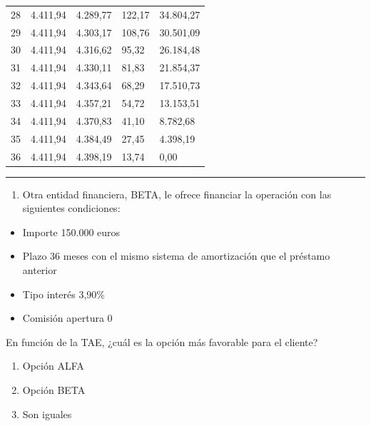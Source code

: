 \documentclass[
  letterpaper,
  DIV=11,
  numbers=noendperiod]{scrartcl}
\providecommand{\tightlist}{%
  \setlength{\itemsep}{0pt}\setlength{\parskip}{0pt}}\usepackage{longtable,booktabs,array}
\begin{document}
\begin{tcolorbox}
\begin{longtable}[]{@{}lllll@{}}
28 & 4.411,94 & 4.289,77 & 122,17 & 34.804,27 \\
29 & 4.411,94 & 4.303,17 & 108,76 & 30.501,09 \\
30 & 4.411,94 & 4.316,62 & 95,32 & 26.184,48 \\
31 & 4.411,94 & 4.330,11 & 81,83 & 21.854,37 \\
32 & 4.411,94 & 4.343,64 & 68,29 & 17.510,73 \\
33 & 4.411,94 & 4.357,21 & 54,72 & 13.153,51 \\
34 & 4.411,94 & 4.370,83 & 41,10 & 8.782,68 \\
35 & 4.411,94 & 4.384,49 & 27,45 & 4.398,19 \\
36 & 4.411,94 & 4.398,19 & 13,74 & 0,00 \\
\end{longtable}

\end{tcolorbox}

\begin{center}\rule{0.5\linewidth}{0.5pt}\end{center}

\begin{enumerate}
\def\labelenumi{\arabic{enumi}.}
\setcounter{enumi}{1}
\tightlist
\item
  Otra entidad financiera, BETA, le ofrece financiar la operación con
  las siguientes condiciones:
\end{enumerate}

\begin{itemize}
\item
  Importe 150.000 euros
\item
  Plazo 36 meses con el mismo sistema de amortización que el préstamo
  anterior
\item
  Tipo interés 3,90\%
\item
  Comisión apertura 0
\end{itemize}

En función de la TAE, ¿cuál es la opción más favorable para el cliente?

\begin{enumerate}
\def\labelenumi{\alph{enumi}.}
\item
  Opción ALFA
\item
  Opción BETA
\item
  Son iguales
\end{enumerate}
\end{document}
